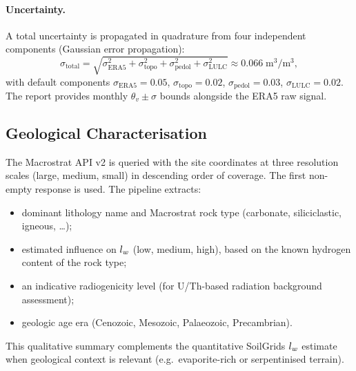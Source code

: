 \paragraph{Uncertainty.}
A total uncertainty is propagated in quadrature from four independent
components (Gaussian error propagation):
\begin{equation}
  \sigma_\mathrm{total}
    = \sqrt{\sigma_\mathrm{ERA5}^2
          + \sigma_\mathrm{topo}^2
          + \sigma_\mathrm{pedol}^2
          + \sigma_\mathrm{LULC}^2}
    \approx 0.066\;\si{\cubic\metre\per\cubic\metre},
  \label{eq:sigma_sm}
\end{equation}
with default components
$\sigma_\mathrm{ERA5} = 0.05$,
$\sigma_\mathrm{topo} = 0.02$,
$\sigma_\mathrm{pedol} = 0.03$,
$\sigma_\mathrm{LULC} = 0.02$.
The report provides monthly $\theta_v \pm \sigma$ bounds alongside the
ERA5 raw signal.

\subsection{Geological Characterisation}

The Macrostrat API v2 is queried with the site coordinates at three
resolution scales (large, medium, small) in descending order of
coverage.
The first non-empty response is used.
The pipeline extracts:
\begin{itemize}[nosep]
  \item dominant lithology name and Macrostrat rock type
        (carbonate, siliciclastic, igneous, \ldots);
  \item estimated influence on $l_w$ (low, medium, high), based on
        the known hydrogen content of the rock type;
  \item an indicative radiogenicity level (for U/Th-based radiation
        background assessment);
  \item geologic age era (Cenozoic, Mesozoic, Palaeozoic, Precambrian).
\end{itemize}
This qualitative summary complements the quantitative SoilGrids
$l_w$ estimate when geological context is relevant (e.g.\
evaporite-rich or serpentinised terrain).
